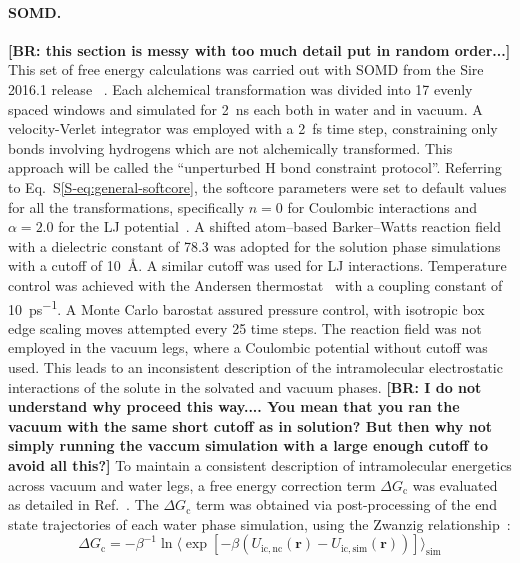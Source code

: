 \documentclass[journal=jctcce,manuscript=article]{achemso}
\begin{document}
{\paragraph{SOMD.} 
{\footnotesize \bf \color{red}[BR: this section is messy with too much detail put in random order...]}
This set of free energy calculations was carried out with SOMD from the Sire 2016.1 release ~\cite{Sire-2016, doi:10.1021/ct300857j}.
%
Each alchemical transformation was divided into 17 evenly spaced windows and simulated for \SI{2}{ns} each both in water and in vacuum. 
%
A velocity-Verlet integrator was employed with a \SI{2}{fs} time step, constraining only bonds involving hydrogens which are not alchemically transformed.  
This approach will be called the ``unperturbed H bond constraint protocol''. 
Referring to Eq.~S\ref{S-eq:general-softcore}, the softcore parameters were set to default values for all the transformations, 
specifically $n = 0$ for Coulombic interactions and $\alpha = 2.0$ for the LJ potential~\cite{doi:10.1021/ct700081t}.  
%
A shifted atom--based Barker--Watts reaction field~\cite{doi:10.1080/00268977300102101} with a dielectric constant of \num{78.3} was adopted for the solution phase simulations with a cutoff of \SI{10}{\angstrom}. 
A similar cutoff was used for LJ interactions. 
%
Temperature control was achieved with the Andersen thermostat~\cite{doi:10.1063/1.439486} with a coupling constant of \SI{10}{ps^{-1}}.  
A Monte Carlo barostat assured pressure control, with isotropic box edge scaling moves attempted every 25 time steps.
%
The reaction field was not employed in the vacuum legs, where a Coulombic potential without cutoff was used.  
This leads to an inconsistent description of the intramolecular electrostatic interactions of the solute in the solvated and vacuum phases.   
{\footnotesize \bf \color{red}[BR: I do not understand why proceed this way.... You mean that you ran the vacuum with the same short cutoff as in solution? But then why not simply running the
vaccum simulation with a large enough cutoff to avoid all this?]}
To maintain a consistent description of intramolecular energetics across vacuum and water legs, 
a free energy correction term $\Delta G_{\mathrm{c}}$ was  evaluated as detailed in Ref.~.  
The $\Delta G_{\mathrm{c}}$ term was obtained via post-processing of the end state trajectories of each water phase simulation, using the Zwanzig relationship~\cite{zwanzig_high-temperature_1954}:
\begin{equation}
 \label{eq:ZwanzigDGfunc}
 \Delta G_{\mathrm{c}} = -\beta^{-1} \ln \langle \exp  \left[-\beta(U_{\mathrm{ic,nc}}(\mathbf{r}) -  U_{\mathrm{ic,sim}}(\mathbf{r}))\right]\rangle_{\mathrm{sim}}

\end{equation}}
\end{document}

